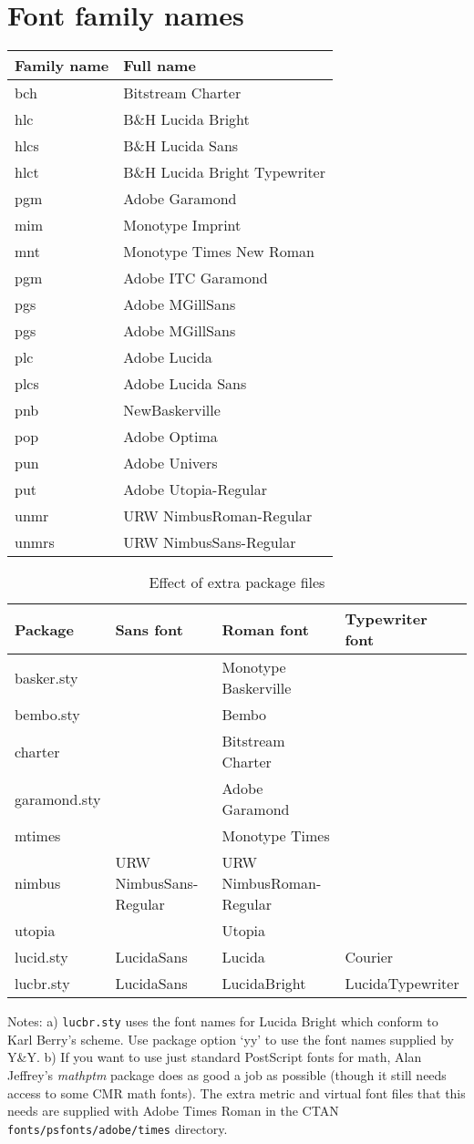 \documentclass{article}
\begin{document}
\section{Font family names}
\begin{tabular}{|ll|}
\hline
Family name & Full name\\
\hline
bch & Bitstream Charter\\
hlc&B\&H Lucida Bright\\
hlcs&B\&H Lucida Sans\\
hlct&B\&H Lucida Bright Typewriter\\
pgm&Adobe Garamond\\
mim&Monotype Imprint\\
mnt&Monotype Times New Roman\\
pgm&Adobe ITC Garamond\\
pgs&Adobe MGillSans\\
pgs&Adobe MGillSans\\
plc&Adobe Lucida\\
plcs&Adobe Lucida Sans\\
pnb&NewBaskerville\\
pop&Adobe Optima\\
pun&Adobe Univers\\
put&Adobe Utopia-Regular\\
unmr&URW NimbusRoman-Regular\\
unmrs&URW NimbusSans-Regular\\
\hline
\end{tabular}

\begin{table}
\begin{small}
  \begin{tabular}{|l|lll|}
\hline
Package & Sans font & Roman font & Typewriter font\\
\hline
basker.sty & & Monotype Baskerville &\\
bembo.sty &  & Bembo & \\
charter & & Bitstream Charter & \\
garamond.sty & & Adobe Garamond & \\
mtimes & & Monotype Times & \\
nimbus  & URW NimbusSans-Regular & URW NimbusRoman-Regular & \\
utopia  & & Utopia & \\
lucid.sty & LucidaSans & Lucida & Courier\\
lucbr.sty & LucidaSans & LucidaBright & LucidaTypewriter\\
\hline
\end{tabular}
\end{small}
\caption{Effect of extra package files\label{exstyles}}

Notes: a) \texttt{lucbr.sty} uses the font names for Lucida Bright
which conform to Karl Berry's scheme. Use package option `yy' to use
the font names supplied by Y\&Y. b) If you want to use just standard
PostScript fonts for math, Alan Jeffrey's \emph{mathptm} package does
as good a job as possible (though it still needs access to some CMR
math fonts). The extra metric and virtual font files that this needs
are supplied with Adobe Times Roman in the CTAN
\verb|fonts/psfonts/adobe/times| directory.
\end{table}
\end{document}
